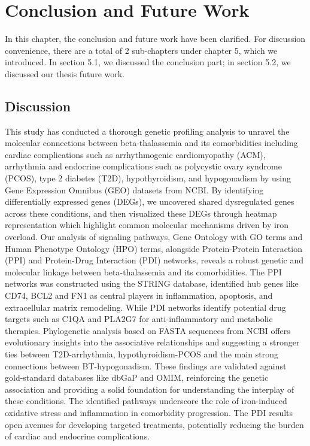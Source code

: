 %
%
\let\textcircled=\pgftextcircled
\chapter{Conclusion and Future Work}
\label{chap:result}
In this chapter, the conclusion and future work have been clarified. For discussion convenience, there are a total of 2 sub-chapters under chapter 5, which we introduced. In section 5.1, we discussed the conclusion part; in section 5.2, we discussed our thesis future work.

\vspace{150mm}

\section{Discussion}
This study has conducted a thorough genetic profiling analysis to unravel the molecular connections between beta-thalassemia and its comorbidities including cardiac complications such as arrhythmogenic cardiomyopathy (ACM), arrhythmia and endocrine complications such as polycystic ovary syndrome (PCOS), type 2 diabetes (T2D), hypothyroidism, and hypogonadism by using Gene Expression Omnibus (GEO) datasets from NCBI. By identifying differentially expressed genes (DEGs), we uncovered shared dysregulated genes across these conditions, and then visualized these DEGs through heatmap representation which highlight common molecular mechanisms driven by iron overload. Our analysis of signaling pathways, Gene Ontology with GO terms and Human Phenotype Ontology (HPO) terms, alongside Protein-Protein Interaction (PPI) and Protein-Drug Interaction (PDI) networks, reveals a robust genetic and molecular linkage between beta-thalassemia and its comorbidities. The PPI networks was constructed using the STRING database, identified hub genes like CD74, BCL2 and FN1 as central players in inflammation, apoptosis, and extracellular matrix remodeling. While PDI networks identify potential drug targets such as C1QA and PLA2G7 for anti-inflammatory and metabolic therapies. Phylogenetic analysis based on FASTA sequences from NCBI offers evolutionary insights into the associative relationships and suggesting a stronger ties between T2D-arrhythmia, hypothyroidism-PCOS and the main strong connections between BT-hypogonadism. These findings are validated against gold-standard databases like dbGaP and OMIM, reinforcing the genetic association and providing a solid foundation for understanding the interplay of these conditions. The identified pathways underscore the role of iron-induced oxidative stress and inflammation in comorbidity progression. The PDI results open avenues for developing targeted treatments, potentially reducing the burden of cardiac and endocrine complications. \\


